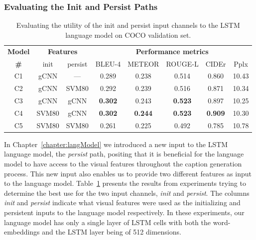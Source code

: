 \subsubsection{Evaluating the Init and Persist Paths}
\label{subsubsec:InitVpersist}
\begin{table}[tbh]
  \centering
  \newcommand{\bs}{\small}
  \begin{adjustbox}{center}
  \begin{tabular}{|c||c|c||c|c|c|c|c|}
    \hline
    \bf Model & \multicolumn{2}{c||}{\bf Features 
    } & \multicolumn{5}{c|}{\bf Performance metrics}\\
     \cline{2-8}
    \bf \# & init & persist &\bs BLEU-4 &\bs METEOR &\bs ROUGE-L &\bs CIDEr&\bs Pplx \\\hline
    C1 & gCNN  & ---  & 0.289 & 0.238 & 0.514 & 0.860 & 10.43  \\
    C2 & gCNN  & SVM80& 0.292 & 0.239 & 0.516 & 0.871 & 10.34  \\
    C3 & gCNN  & gCNN &\bf 0.302 & 0.243 &\bf 0.523 & 0.897 & 10.25  \\
    C4 & SVM80 & gCNN &\bf 0.302 &\bf0.244 &\bf 0.523 &\bf0.909 & 10.30  \\
    C5 & SVM80 & SVM80& 0.261 & 0.225 & 0.492 & 0.785 & 10.78 \\\hline
  \end{tabular}
  \end{adjustbox}
  \caption{Evaluating the utility of the init and persist input channels to the
          LSTM language model on COCO validation set.}
  \label{tab:resCocInitVPers}
\end{table}

In Chapter~\ref{chapter:langModel} we introduced a new input to the LSTM language
model, the \emph{persist} path, positing that it is beneficial for the language
model to have access to the visual features throughout the caption generation
process.
This new input also enables us to provide two different features as input to the
language model.
Table~\ref{tab:resCocInitVPers} presents the results from experiments trying to
determine the best use for the two input channels, \emph{init} and
\emph{persist}.
The columns \emph{init} and \emph{persist} indicate what visual features were
used as the initializing and persistent inputs to the language model
respectively.
In these experiments, our language model has only a single layer of LSTM cells
with both the word-embeddings and the LSTM layer being of 512 dimensions.

